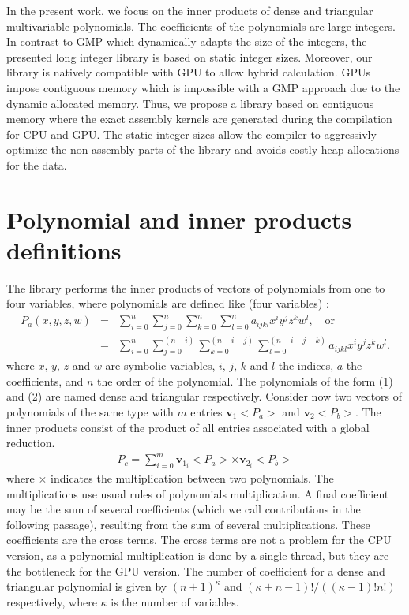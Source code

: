\documentclass[oribibl]{llncs2e/llncs}
\begin{document}
In the present work, we focus on the inner products of dense and triangular multivariable polynomials.  The coefficients of the polynomials are large integers. 
In contrast to GMP which dynamically adapts the size of the integers, the presented long integer library is based on static integer sizes.
Moreover, our library is natively compatible with GPU to allow hybrid calculation. GPUs impose contiguous memory which is impossible with a GMP approach due to the dynamic allocated memory.
Thus, we propose a  library based on contiguous memory where the exact assembly kernels are generated during the compilation for CPU and GPU.
The static integer sizes allow the compiler to aggressivly optimize the non-assembly parts of the library and avoids costly heap allocations for the data. 

\section{Polynomial and inner products definitions}

The library performs the inner products of vectors of polynomials from one to four variables, where polynomials are defined like (four variables) :
\begin{eqnarray}
P_a(x,y,z,w) & = & \sum_{i=0}^n \sum_{j=0}^n  \sum_{k=0}^n \sum_{l=0}^n  a_{ijkl} x^i y^j z^k w^l , \,\,\,\,\,\, \text{or} \\
                   & = & \sum_{i=0}^n \sum_{j=0}^{(n-i)} \sum_{k=0}^{(n-i-j)} \sum_{l=0}^{(n-i-j-k)}  a_{ijkl} x^i y^j z^k w^l  .
\end{eqnarray}
where  $x,\,y,\,z$ and $w$ are symbolic variables,  $i,\,j,\,k$ and $l$  the indices, $a$  the coefficients, and $n$ the order of the polynomial.
The polynomials of the form  (1) and (2) are named dense and triangular respectively. Consider now two vectors of polynomials of the  same type with $m$ 
entries  $\boldsymbol{v}_1<P_a>$ and  $\boldsymbol{v}_2<P_b>$. The inner products  consist of the product 
of all entries  associated with a global reduction. 
 \begin{eqnarray}
 P_c = \sum_{i=0}^m \boldsymbol{v}_{1_i}<P_a>  \times  \boldsymbol{v}_{2_i}<P_b> \label{poly1} \label{InnerProduct}
\end{eqnarray}
where $\times$ indicates the multiplication between two polynomials. The multiplications use usual rules of polynomials multiplication. 
A final coefficient may be the sum of several coefficients (which we call contributions in the following passage), resulting from the sum of several multiplications. These coefficients are the cross terms. 
The cross terms are not a problem for the CPU version, as a polynomial multiplication is done by a single thread, but they are the bottleneck for the GPU version.
The number of coefficient for a dense and triangular polynomial is given by $(n+1)^{\kappa}$ and  $(\kappa+n-1)! / ( (\kappa-1)! n! )$ respectively, where $\kappa$ is the number of variables. 
\end{document}
